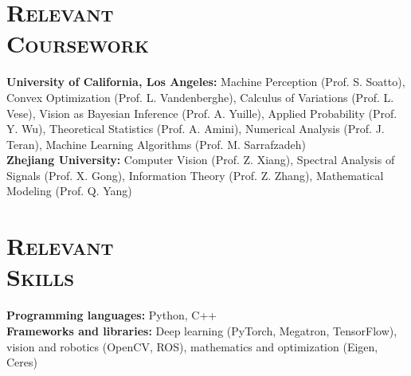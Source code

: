 \documentclass[margin, line]{res} %
\begin{document}
\begin{resume}

\section{\textsc{Relevant\\Coursework}}
\textbf{University of California, Los Angeles:} Machine Perception (Prof. S. Soatto), Convex Optimization (Prof. L. Vandenberghe), Calculus of Variations (Prof. L. Vese), Vision as Bayesian Inference (Prof. A. Yuille), Applied Probability (Prof. Y. Wu), Theoretical Statistics (Prof. A. Amini), Numerical Analysis (Prof. J. Teran), Machine Learning Algorithms (Prof. M. Sarrafzadeh)\\
\textbf{Zhejiang University:} Computer Vision (Prof. Z. Xiang), Spectral Analysis of Signals (Prof. X. Gong), Information Theory (Prof. Z. Zhang), Mathematical Modeling (Prof. Q. Yang)

\section{\textsc{Relevant\\Skills}}
\textbf{Programming languages:} Python, C++ \\
\textbf{Frameworks and libraries:} Deep learning (PyTorch, Megatron, TensorFlow), vision and robotics (OpenCV, ROS), mathematics and optimization (Eigen, Ceres)


\end{resume}
\end{document}
